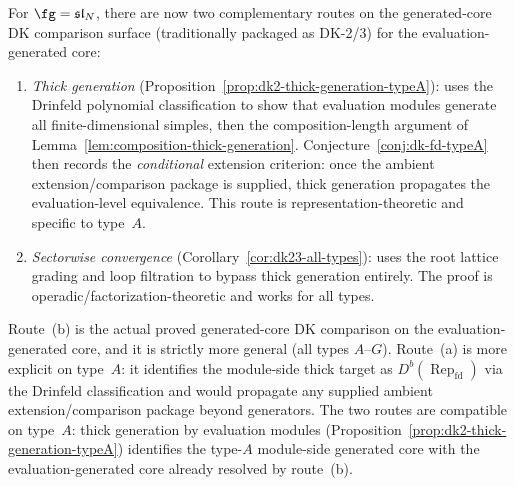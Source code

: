 \begin{remark}
\label{rem:two-dk-proofs}
For $\fg = \mathfrak{sl}_N$, there are now two complementary routes on
the generated-core DK comparison surface
\textup{(}traditionally packaged as DK-2/3\textup{)} for the
evaluation-generated core:
\begin{enumerate}[label=\textup{(\alph*)}]
\item \emph{Thick generation}
 \textup{(}Proposition~\ref{prop:dk2-thick-generation-typeA}\textup{)}:
 uses the
 Drinfeld polynomial classification to show that evaluation modules
 generate all finite-dimensional simples, then the composition-length
 argument of Lemma~\ref{lem:composition-thick-generation}. Conjecture~\ref{conj:dk-fd-typeA}
 then records the \emph{conditional} extension criterion: once the
 ambient extension/comparison package is supplied, thick generation
 propagates the evaluation-level equivalence. This route is
 representation-theoretic and specific to type~$A$.
\item \emph{Sectorwise convergence}
 \textup{(}Corollary~\ref{cor:dk23-all-types}\textup{)}: uses
 the root lattice grading and loop filtration to bypass thick
 generation entirely. The proof is
 operadic/factorization-theoretic and works for all types.
\end{enumerate}
Route~(b) is the actual proved generated-core DK comparison on the
evaluation-generated core, and it is strictly more general
(all types $A$--$G$). Route~(a) is more explicit on type~$A$:
it identifies the module-side thick target as
$D^b(\operatorname{Rep}_{\mathrm{fd}})$ via the Drinfeld
classification and would propagate any supplied ambient
extension/comparison package beyond generators. The two routes are
compatible on type~$A$: thick generation by evaluation modules
\textup{(}Proposition~\ref{prop:dk2-thick-generation-typeA}\textup{)}
identifies the type-$A$ module-side generated core with the
evaluation-generated core already resolved by route~(b).
\end{remark}

